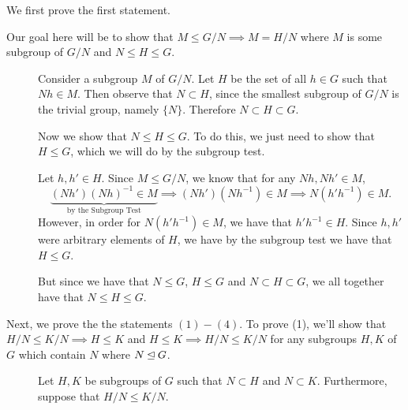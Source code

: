     \begin{prf}
        We first prove the first statement.

        \textcolor{NavyBlue}{Our goal here will be to show that $M \le
        G/N \implies M = H/N$ where $M$ is some subgroup of $G/N$ and
        $N \le H \le G$.} 
        \begin{description}
            \item[\phantom{1}]
            \hspace{0.5cm} Consider a subgroup $M$
            of $G/N$. Let $H$ be the set of all $h \in G$ such that
            $Nh \in M$. Then observe that $N \subset H$, since the smallest
            subgroup of $G/N$ is the trivial group, namely $\{N\}$.
            Therefore $N \subset H \subset G$.
            
            \textcolor{NavyBlue}{Now we
            show that $N \le H \le G$. To do this, we just need to
            show that $H \le G$, which we will do by the subgroup test.}

            Let $h, h' \in H$. Since $M \le G/N$, we know that for any
            $Nh, Nh' \in M$,  
            \[
                \underbrace{(Nh')(Nh)^{-1} \in M}_{\text{by the Subgroup Test}} \implies (Nh')(Nh^{-1}) \in M 
                \implies N(h'h^{-1}) \in M.
            \]
            However, in order for $N(h' h^{-1}) \in M$, we have that
            $h'h^{-1} \in H$. Since $h, h'$ were arbitrary elements of
           $H$, we have by the subgroup test we have that
            $H \le G$.  
            
            But since we have that $N \le G$, $H \le G$ and $N \subset
            H \subset G$, we all together have that $N \le H \le G$. 
        \end{description}
        Next, we prove the the statements $(1)-(4).$
        \textcolor{NavyBlue}{To prove (1), we'll show that $H/N \le K/N \implies H \le K$
        and $H \le K \implies H/N \le K/N$ for any subgroups $H, K$ of
        $G$ which contain $N$ where $N \unlhd G$.}

        \begin{description}
            \item[\phantom{1}]
            \hspace{0.5cm} Let $H, K$ be subgroups of $G$ such that $N
            \subset H$ and $N \subset K$. Furthermore, suppose that 
            $H/N \le K/N$.
            
        \end{description}
    \end{prf}

